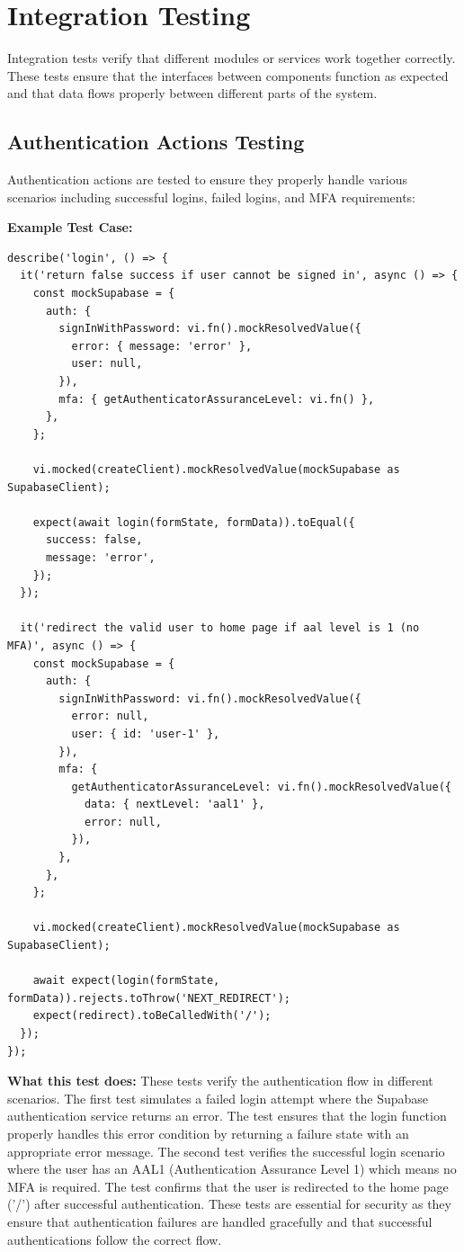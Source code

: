 \section{Integration Testing}

Integration tests verify that different modules or services work together correctly. These tests ensure that the interfaces between components function as expected and that data flows properly between different parts of the system.

\subsection{Authentication Actions Testing}

Authentication actions are tested to ensure they properly handle various scenarios including successful logins, failed logins, and MFA requirements:

\textbf{Example Test Case:}
\begin{verbatim}
describe('login', () => {
  it('return false success if user cannot be signed in', async () => {
    const mockSupabase = {
      auth: {
        signInWithPassword: vi.fn().mockResolvedValue({
          error: { message: 'error' },
          user: null,
        }),
        mfa: { getAuthenticatorAssuranceLevel: vi.fn() },
      },
    };

    vi.mocked(createClient).mockResolvedValue(mockSupabase as SupabaseClient);

    expect(await login(formState, formData)).toEqual({
      success: false,
      message: 'error',
    });
  });

  it('redirect the valid user to home page if aal level is 1 (no MFA)', async () => {
    const mockSupabase = {
      auth: {
        signInWithPassword: vi.fn().mockResolvedValue({
          error: null,
          user: { id: 'user-1' },
        }),
        mfa: {
          getAuthenticatorAssuranceLevel: vi.fn().mockResolvedValue({
            data: { nextLevel: 'aal1' },
            error: null,
          }),
        },
      },
    };

    vi.mocked(createClient).mockResolvedValue(mockSupabase as SupabaseClient);

    await expect(login(formState, formData)).rejects.toThrow('NEXT_REDIRECT');
    expect(redirect).toBeCalledWith('/');
  });
});
\end{verbatim}

\textbf{What this test does:} These tests verify the authentication flow in different scenarios. The first test simulates a failed login attempt where the Supabase authentication service returns an error. The test ensures that the login function properly handles this error condition by returning a failure state with an appropriate error message. The second test verifies the successful login scenario where the user has an AAL1 (Authentication Assurance Level 1) which means no MFA is required. The test confirms that the user is redirected to the home page ('/') after successful authentication. These tests are essential for security as they ensure that authentication failures are handled gracefully and that successful authentications follow the correct flow.

